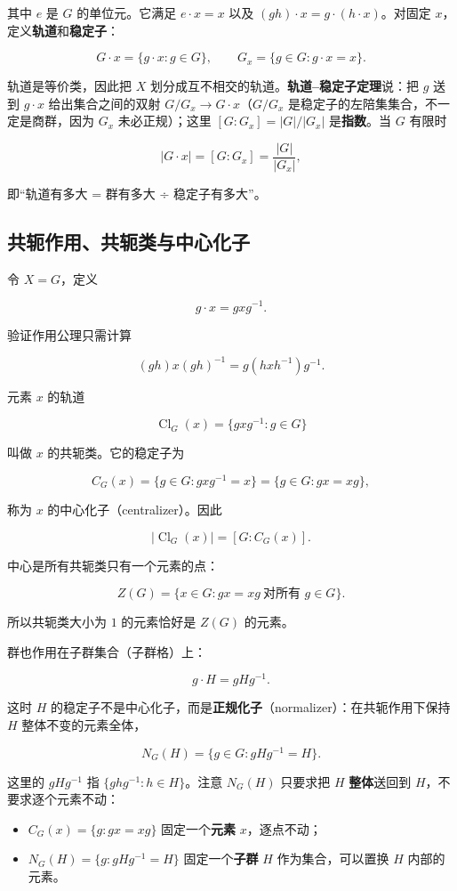 其中 $e$ 是 $G$ 的单位元。它满足 $e\cdot x=x$ 以及 $(gh)\cdot x=g\cdot(h\cdot x)$。对固定 $x$，定义\textbf{轨道}和\textbf{稳定子}：

\[
G\cdot x=\{g\cdot x:g\in G\},
\qquad
G_x=\{g\in G:g\cdot x=x\}.
\]

轨道是等价类，因此把 $X$ 划分成互不相交的轨道。\textbf{轨道--稳定子定理}说：把 $g$ 送到 $g\cdot x$ 给出集合之间的双射 $G/G_x\to G\cdot x$（$G/G_x$ 是稳定子的左陪集集合，不一定是商群，因为 $G_x$ 未必正规）；这里 $[G:G_x]=|G|/|G_x|$ 是\textbf{指数}。当 $G$ 有限时

\[
|G\cdot x|=[G:G_x]=\frac{|G|}{|G_x|},
\]

即“轨道有多大 = 群有多大 ÷ 稳定子有多大”。

\subsection{共轭作用、共轭类与中心化子}


令 $X=G$，定义

\[
 g\cdot x=gxg^{-1}.
\]

验证作用公理只需计算

\[
(gh)x(gh)^{-1}=g(hxh^{-1})g^{-1}.
\]

元素 $x$ 的轨道

\[
\operatorname{Cl}_G(x)=\{gxg^{-1}:g\in G\}
\]

叫做 $x$ 的共轭类。它的稳定子为

\[
C_G(x)=\{g\in G:gxg^{-1}=x\}
=\{g\in G:gx=xg\},
\]

称为 $x$ 的中心化子（centralizer）。因此

\[
|\operatorname{Cl}_G(x)|=[G:C_G(x)].
\]

中心是所有共轭类只有一个元素的点：

\[
Z(G)=\{x\in G:gx=xg\ \text{对所有 }g\in G\}.
\]

所以共轭类大小为 $1$ 的元素恰好是 $Z(G)$ 的元素。

群也作用在子群集合（子群格）上：

\[
 g\cdot H=gHg^{-1}.
\]

这时 $H$ 的稳定子不是中心化子，而是\textbf{正规化子}（normalizer）：在共轭作用下保持 $H$ 整体不变的元素全体，

\[
N_G(H)=\{g\in G:gHg^{-1}=H\}.
\]

这里的 $gHg^{-1}$ 指 $\{ghg^{-1}:h\in H\}$。注意 $N_G(H)$ 只要求把 $H$ \textbf{整体}送回到 $H$，不要求逐个元素不动：

\begin{itemize}
\item $C_G(x)=\{g:gx=xg\}$ 固定一个\textbf{元素} $x$，逐点不动；
\item $N_G(H)=\{g:gHg^{-1}=H\}$ 固定一个\textbf{子群} $H$ 作为集合，可以置换 $H$ 内部的元素。
\end{itemize}


